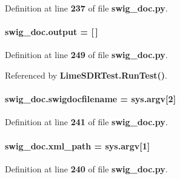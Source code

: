 Definition at line {\bf 237} of file {\bf swig\+\_\+doc.\+py}.

\paragraph[{output}]{ swig\+\_\+doc.\+output = [$\,$]}\label{namespaceswig__doc_a8d06cdf472ce0d37c772da0ddd88c26f}


Definition at line {\bf 249} of file {\bf swig\+\_\+doc.\+py}.



Referenced by {\bf Lime\+S\+D\+R\+Test.\+Run\+Test()}.

\paragraph[{swigdocfilename}]{\setlength{\rightskip}{0pt plus 5cm}swig\+\_\+doc.\+swigdocfilename = sys.\+argv[2]}\label{namespaceswig__doc_a46fe5095db15d0b0d4f7387cfb4a3c12}


Definition at line {\bf 241} of file {\bf swig\+\_\+doc.\+py}.

\paragraph[{xml\+\_\+path}]{\setlength{\rightskip}{0pt plus 5cm}swig\+\_\+doc.\+xml\+\_\+path = sys.\+argv[1]}\label{namespaceswig__doc_a75db401cebcfaad65cb2266641c465e9}


Definition at line {\bf 240} of file {\bf swig\+\_\+doc.\+py}.


